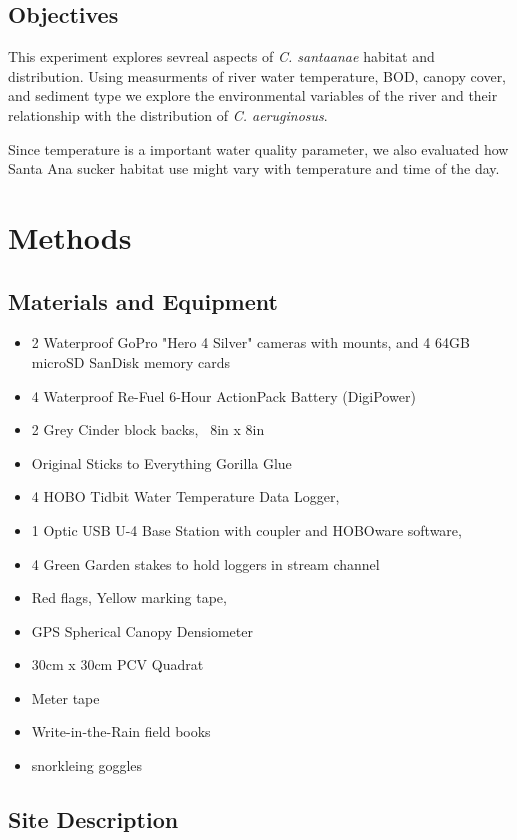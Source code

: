\documentclass{article}\usepackage[]{graphicx}\usepackage[]{color}
\begin{document}
\subsection{Objectives}
This experiment explores sevreal aspects of \emph{C. santaanae} habitat and distribution. Using measurments of river water temperature, BOD, canopy cover, and sediment type we explore the environmental variables of the river and their relationship with the distribution of \emph{C. aeruginosus}. 

Since temperature is a important water quality parameter, we also evaluated how Santa Ana sucker habitat use might vary with temperature and time of the day. 

\section{Methods}

\subsection{Materials and Equipment}
\begin{itemize}
\item 2 Waterproof GoPro "Hero 4 Silver" cameras with mounts, and 4 64GB microSD SanDisk memory cards
\item 4 Waterproof Re-Fuel 6-Hour ActionPack Battery (DigiPower)
\item 2 Grey Cinder block backs, ~8in x 8in
\item Original Sticks to Everything Gorilla Glue
\item 4 HOBO Tidbit Water Temperature Data Logger,
\item 1 Optic USB U-4 Base Station with coupler and HOBOware software,
\item 4 Green Garden stakes to hold loggers in stream channel
\item Red flags, Yellow marking tape,
\item GPS Spherical Canopy Densiometer
\item 30cm x 30cm PCV Quadrat
\item Meter tape
\item Write-in-the-Rain field books
\item snorkleing goggles 
\end{itemize}

\subsection{Site Description}
\end{document}
